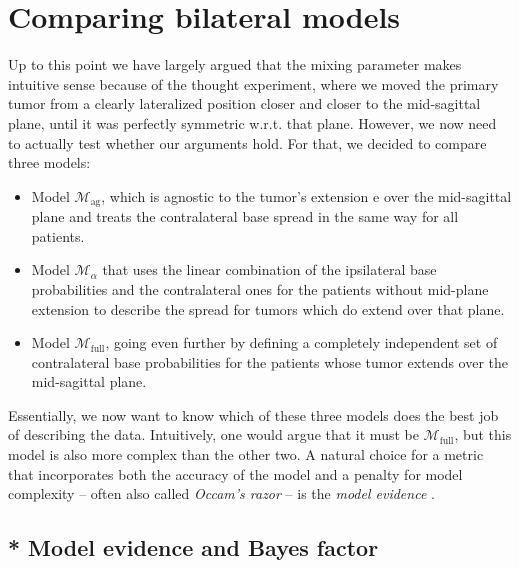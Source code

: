 \documentclass[\relativeRoot/main.tex]{subfiles}
\begin{document}
\section{Comparing bilateral models}
\label{sec:bilateral:model_comp}

Up to this point we have largely argued that the mixing parameter makes intuitive sense because of the thought experiment, where we moved the primary tumor from a clearly lateralized position closer and closer to the mid-sagittal plane, until it was perfectly symmetric w.r.t. that plane. However, we now need to actually test whether our arguments hold. For that, we decided to compare three models:

\begin{itemize}
    \item Model $\mathcal{M}_\text{ag}$, which is agnostic to the tumor's extension $\text{e}$ over the mid-sagittal plane and treats the contralateral base spread in the same way for all patients.
    \item Model $\mathcal{M}_\alpha$ that uses the linear combination of the ipsilateral base probabilities and the contralateral ones for the patients without mid-plane extension to describe the spread for tumors which do extend over that plane.
    \item Model $\mathcal{M}_\text{full}$, going even further by defining a completely independent set of contralateral base probabilities for the patients whose tumor extends over the mid-sagittal plane.
\end{itemize}

Essentially, we now want to know which of these three models does the best job of describing the data. Intuitively, one would argue that it must be $\mathcal{M}_\text{full}$, but this model is also more complex than the other two. A natural choice for a metric that incorporates both the accuracy of the model and a penalty for model complexity -- often also called \emph{Occam's razor} -- is the \emph{model evidence} \cite{aponte_introduction_2022}.

\subsection{* Model evidence and Bayes factor}
\label{subsec:bilateral:model_comp:evidence}
\end{document}
